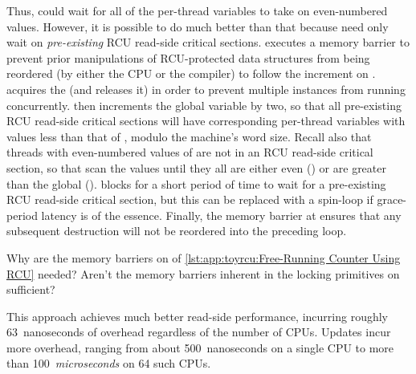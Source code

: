 \begin{lineref}
Thus,  could wait for all of the per-thread
 variables to take on even-numbered values.
However, it is possible to do much better than that because
 need only wait on \emph{pre-existing}
RCU read-side critical sections.
 executes a memory barrier to prevent prior manipulations
of RCU-protected data structures from being reordered (by either
the CPU or the compiler) to follow the increment on
.
 acquires the 
(and  releases it)
in order to prevent multiple
 instances from running concurrently.
 then increments the global  variable by
two, so that all pre-existing RCU read-side critical sections will
have corresponding per-thread  variables with
values less than that of , modulo the machine's
word size.
Recall also that threads with even-numbered values of 
are not in an RCU read-side critical section,
so that 
scan the  values until they
all are either even () or are greater than the global
 ().
 blocks for a short period of time to wait for a
pre-existing RCU read-side critical section, but this can be replaced with
a spin-loop if grace-period latency is of the essence.
Finally, the memory barrier at  ensures that any subsequent
destruction will not be reordered into the preceding loop.
\end{lineref}

\QuickQuiz{}
	\begin{lineref}
	Why are the memory barriers on  of
	\cref{lst:app:toyrcu:Free-Running Counter Using RCU}
	needed?
	Aren't the memory barriers inherent in the locking
	primitives on  sufficient?
	\end{lineref}
 \QuickQuizEnd

This approach achieves much better read-side performance, incurring
roughly 63~nanoseconds of overhead regardless of the number of
 CPUs.
Updates incur more overhead, ranging from about 500~nanoseconds on
a single  CPU to more than 100~\emph{microseconds} on 64
such CPUs.

